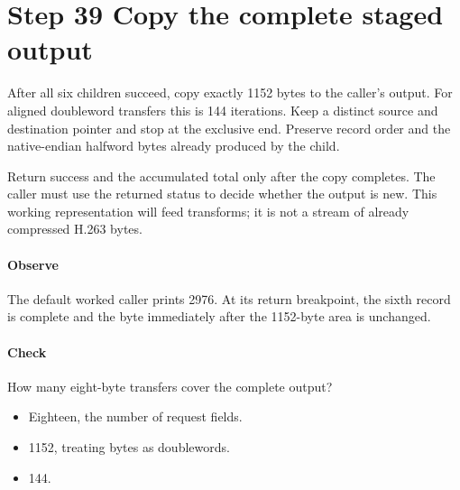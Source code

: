 \section{Step 39 Copy the complete staged output}\label{h263-macroblock-s09}
After all six children succeed, copy exactly 1152 bytes to the caller's output.
For aligned doubleword transfers this is 144 iterations. Keep a distinct source
and destination pointer and stop at the exclusive end. Preserve record order and
the native-endian halfword bytes already produced by the child.

Return success and the accumulated total only after the copy completes. The
caller must use the returned status to decide whether the output is new. This
working representation will feed transforms; it is not a stream of already
compressed H.263 bytes.

\paragraph{Observe} The default worked caller prints 2976. At its return
breakpoint, the sixth record is complete and the byte immediately after the
1152-byte area is unchanged.
\paragraph{Check} How many eight-byte transfers cover the complete output?
\begin{itemize}
  \item[A.] Eighteen, the number of request fields.
  \item[B.] 1152, treating bytes as doublewords.
  \item[C.] 144.
\end{itemize}
